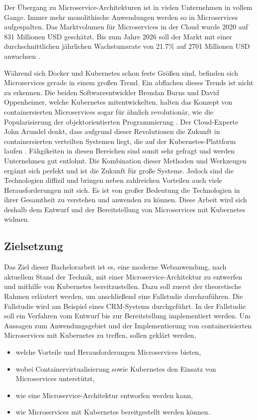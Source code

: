 Der Übergang zu Microservice-Architekturen ist in vielen Unternehmen in vollem Gange. Immer mehr monolithische Anwendungen werden so in Microservices aufgespalten. Das Marktvolumen für Microservices in der Cloud wurde 2020 auf 831 Millionen \ac{USD} geschätzt. Bis zum Jahre 2026 soll der Markt mit einer durchschnittlichen jährlichen Wachstumsrate von 21.7\%  auf 2701 Millionen \ac{USD} anwachsen \parencite[vgl.][S. 7]{mordorintelligenceGlobal2020}.

Während sich Docker und Kubernetes schon feste Größen sind, befinden sich Microservices gerade in einem großen Trend. Ein abflachen dieses Trends ist nicht zu erkennen. Die beiden Softwareentwickler Brendan Burns und David Oppenheimer, welche Kubernetes mitentwickelten, halten das Konzept von containersierten Microservices sogar für ähnlich revolutionär, wie die Popularisierung der objektorientierten Programmierung \parencite[vgl.][S. 1]{burnsDesign2016}. Der Cloud-Experte John Arundel denkt, dass aufgrund dieser Revolutionen die Zukunft in containersierten verteilten Systemen liegt, die auf der Kubernetes-Plattform laufen \parencite[vgl.][S. 1]{arundelCloud2019}. Fähgikeiten in diesen Bereichen sind somit sehr gefragt und werden Unternehmen gut entlohnt. Die Kombination dieser Methoden und Werkzeugen ergänzt sich perfekt und ist die Zukunft für große Systeme. Jedoch sind die Technologien diffizil und bringen neben zahlreichen Vorteilen auch viele Herausforderungen mit sich. Es ist von großer Bedeutung die Technologien in ihrer Gesamtheit zu verstehen und anwenden zu können. Diese Arbeit wird sich deshalb dem Entwurf und der Bereitstellung von Microservices mit Kubernetes widmen.
  
\subsection{Zielsetzung}
Das Ziel dieser Bachelorarbeit ist es, eine moderne Webanwendung, nach aktuellem Stand der Technik, mit einer Microservice-Architektur zu entwerfen und mithilfe von Kubernetes bereitzustellen. Dazu soll zuerst der theoretische Rahmen erläutert werden, um anschließend eine Fallstudie durchzuführen. Die Fallstudie wird am Beispiel eines \acp{CRM-System} durchgeführt. In der Fallstudie soll ein Verfahren vom Entwurf bis zur Bereitstellung implementiert werden. Um Aussagen zum Anwendungsgebiet und der Implementierung von containerisierten Microservices mit Kubernetes zu treffen, sollen geklärt werden, 

\begin{itemize}
\item welche Vorteile und Herausforderungen Microservices bieten,
\item wobei Containervirtualisierung sowie Kubernetes den Einsatz von Microservices unterstützt,
\item wie eine Microservice-Architektur entworfen werden kann,
\item wie Microservices mit Kubernetes bereitgestellt werden können.
\end{itemize}

